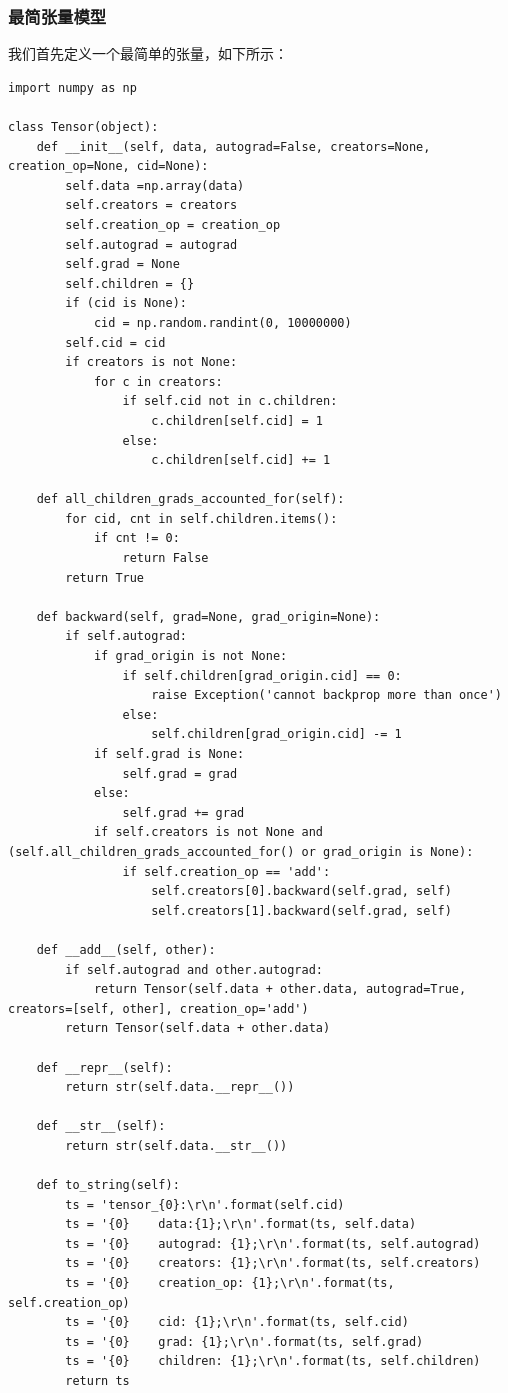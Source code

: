 \subsubsection{最简张量模型}
我们首先定义一个最简单的张量，如下所示：
\begin{lstlisting}
import numpy as np

class Tensor(object):
	def __init__(self, data, autograd=False, creators=None, creation_op=None, cid=None):
		self.data =np.array(data)
		self.creators = creators
		self.creation_op = creation_op
		self.autograd = autograd
		self.grad = None
		self.children = {}
		if (cid is None):
			cid = np.random.randint(0, 10000000)
		self.cid = cid
		if creators is not None:
			for c in creators:
				if self.cid not in c.children:
					c.children[self.cid] = 1
				else:
					c.children[self.cid] += 1

	def all_children_grads_accounted_for(self):
		for cid, cnt in self.children.items():
			if cnt != 0:
				return False
		return True

	def backward(self, grad=None, grad_origin=None):
		if self.autograd:
			if grad_origin is not None:
				if self.children[grad_origin.cid] == 0:
					raise Exception('cannot backprop more than once')
				else:
					self.children[grad_origin.cid] -= 1
			if self.grad is None:
				self.grad = grad
			else:
				self.grad += grad
			if self.creators is not None and (self.all_children_grads_accounted_for() or grad_origin is None):
				if self.creation_op == 'add':
					self.creators[0].backward(self.grad, self)
					self.creators[1].backward(self.grad, self)

	def __add__(self, other):
		if self.autograd and other.autograd:
			return Tensor(self.data + other.data, autograd=True, creators=[self, other], creation_op='add')
		return Tensor(self.data + other.data)

	def __repr__(self):
		return str(self.data.__repr__())

	def __str__(self):
		return str(self.data.__str__())

	def to_string(self):
		ts = 'tensor_{0}:\r\n'.format(self.cid)
		ts = '{0}    data:{1};\r\n'.format(ts, self.data)
		ts = '{0}    autograd: {1};\r\n'.format(ts, self.autograd)
		ts = '{0}    creators: {1};\r\n'.format(ts, self.creators)
		ts = '{0}    creation_op: {1};\r\n'.format(ts, self.creation_op)
		ts = '{0}    cid: {1};\r\n'.format(ts, self.cid)
		ts = '{0}    grad: {1};\r\n'.format(ts, self.grad)
		ts = '{0}    children: {1};\r\n'.format(ts, self.children)
		return ts
\end{lstlisting}
